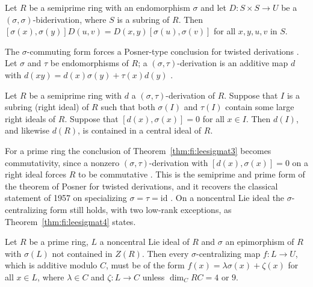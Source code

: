 \begin{lemma}\label{thm:fi:leesigmalemma}
Let $R$ be a semiprime ring with an endomorphism $\sigma$ and let
$D\colon S\times S\to U$ be a $(\sigma,\sigma)$-biderivation, where $S$ is
a subring of $R$. Then $[\sigma(x),\sigma(y)]D(u,v)=D(x,y)[\sigma(u),\sigma(v)]$
for all $x,y,u,v$ in $S$.
\end{lemma}

The $\sigma$-commuting form forces a Posner-type conclusion for twisted
derivations \cite[Theorem~3, p.~2948]{LeeTK2001SigmaCommuting}. Let
$\sigma$ and $\tau$ be endomorphisms of $R$; a
$(\sigma,\tau)$-derivation is an additive map $d$ with
$d(xy)=d(x)\sigma(y)+\tau(x)d(y)$
\cite[p.~2948]{LeeTK2001SigmaCommuting}.

\begin{theorem}\label{thm:fi:leesigmat3}
Let $R$ be a semiprime ring with $d$ a $(\sigma,\tau)$-derivation of $R$.
Suppose that $I$ is a subring (right ideal) of $R$ such that both
$\sigma(I)$ and $\tau(I)$ contain some large right ideals of $R$. Suppose
that $[d(x),\sigma(x)]=0$ for all $x\in I$. Then $d(I)$, and likewise $d(R)$, is
contained in a central ideal of $R$.
\end{theorem}

For a prime ring the conclusion of Theorem~\ref{thm:fi:leesigmat3}
becomes commutativity, since a nonzero $(\sigma,\tau)$-derivation with
$[d(x),\sigma(x)]=0$ on a right ideal forces $R$ to be commutative
\cite[Corollary~4, p.~2950]{LeeTK2001SigmaCommuting}. This is the
semiprime and prime form of the theorem of Posner for twisted derivations, and
it recovers the classical statement of 1957 on specializing
$\sigma=\tau=\mathrm{id}$ \cite[p.~2946]{LeeTK2001SigmaCommuting}. On a
noncentral Lie ideal the $\sigma$-centralizing form still holds, with two
low-rank exceptions, as Theorem~\ref{thm:fi:leesigmat4} states.

\begin{theorem}\label{thm:fi:leesigmat4}
Let $R$ be a prime ring, $L$ a noncentral Lie ideal of $R$ and $\sigma$ an
epimorphism of $R$ with $\sigma(L)$ not contained in $Z(R)$. Then every
$\sigma$-centralizing map $f\colon L\to U$, which is additive modulo $C$,
must be of the form $f(x)=\lambda\sigma(x)+\zeta(x)$ for all $x\in L$,
where $\lambda\in C$ and $\zeta\colon L\to C$ unless $\dim_C RC=4$ or $9$.
\end{theorem}

